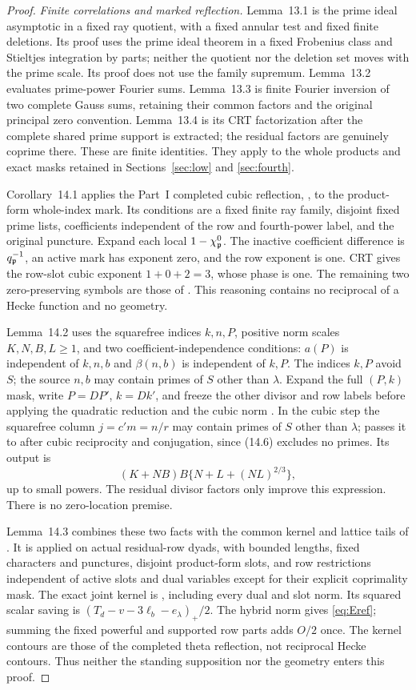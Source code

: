\begin{proof}
\emph{Finite correlations and marked reflection.}
Lemma~13.1 is the prime ideal asymptotic in a fixed ray quotient, with a fixed annular test and fixed finite deletions. Its proof uses the prime ideal theorem in a fixed Frobenius class  and Stieltjes integration by parts; neither the quotient nor the deletion set moves with the prime scale. Its proof does not use the family supremum.
Lemma~13.2 evaluates prime-power Fourier sums. Lemma~13.3 is finite Fourier inversion of two complete Gauss sums, retaining their common factors and the original principal zero convention. Lemma~13.4 is its CRT factorization after the complete shared prime support is extracted; the residual factors are genuinely coprime there. These are finite identities. They apply to the whole products and exact masks retained in Sections~\ref{sec:low} and \ref{sec:fourth}.

Corollary~14.1 applies the Part~I completed cubic reflection, , to the product-form whole-index mark. Its conditions are a fixed finite ray family, disjoint fixed prime lists, coefficients independent of the row and fourth-power label, and the original puncture. Expand each local $1-\chi_\mathfrak p^0$. The inactive coefficient difference is $q_\mathfrak p^{-1}$, an active mark has exponent zero, and the row exponent is one. CRT gives the row-slot cubic exponent $1+0+2=3$, whose phase is one. The remaining two zero-preserving symbols are those of . This reasoning contains no reciprocal of a Hecke function and no geometry.

Lemma~14.2 uses the squarefree indices $k,n,P$, positive norm scales $K,N,B,L\ge1$, and two coefficient-independence conditions: $a(P)$ is independent of $k,n,b$ and $\beta(n,b)$ is independent of $k,P$. The indices $k,P$ avoid $S$; the source $n,b$ may contain primes of $S$ other than $\lambda$. Expand the full $(P,k)$ mask, write $P=DP'$, $k=Dk'$, and freeze the other divisor and row labels before applying the quadratic reduction  and the cubic norm . In the cubic step the squarefree column $j=c'm=n/r$ may contain primes of $S$ other than $\lambda$;  passes it to  after cubic reciprocity and conjugation, since (14.6) excludes no primes. Its output is
\[
 (K+NB)B\{N+L+(NL)^{2/3}\},
\]
up to small powers. The residual divisor factors only improve this expression. There is no zero-location premise.

Lemma~14.3 combines these two facts with the common kernel and lattice tails of . It is applied on actual residual-row dyads, with bounded lengths, fixed characters and punctures, disjoint product-form slots, and row restrictions independent of active slots and dual variables except for their explicit coprimality mask. The exact joint kernel is , including every dual and slot norm. Its squared scalar saving is $(T_d-v-3\ell_b-e_\lambda)_+/2$. The hybrid norm gives \eqref{eq:Eref}; summing the fixed powerful and supported row parts adds $O/2$ once. The kernel contours are those of the completed theta reflection, not reciprocal Hecke contours. Thus neither the standing supposition nor the geometry  enters this proof.


\end{proof}
